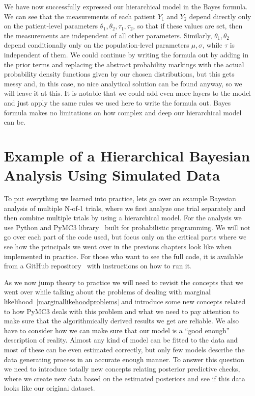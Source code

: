 \documentclass[12pt,a4paper,leqno]{report}
\theoremstyle{plain}
\theoremstyle{definition}
\theoremstyle{remark}
\begin{document}
We have now successfully expressed our hierarchical model in the Bayes formula.
We can see that the measurements of each patient \(Y_1 \) and \(Y_2 \) depend directly
only on the patient-level parameters \(\theta_1, \theta_2, \tau_1, \tau_2\), so that if these values are set, then the
measurements are independent of all other parameters. Similarly, \(\theta_1, \theta_2 \) depend conditionally only
on the population-level parameters \(\mu, \sigma \), while \(\tau \) is independent of
them. We could continue by writing the
formula out by adding in the prior terms and replacing the abstract probability
markings with the actual probability density functions given by our chosen
distributions, but this gets messy and, in this case, no nice analytical solution can be
found anyway, so we will leave it at this. It is notable that we could add even
more layers to the model and just apply the same rules we used here to write the formula
out. Bayes formula makes no limitations on how complex and deep our hierarchical model
can be.

\chapter{Example of a Hierarchical Bayesian Analysis Using Simulated Data}

To put everything we learned into practice, lets go over an example Bayesian
analysis of multiple N-of-1 trials, where we first analyze one trial separately and then
combine multiple trials by using a hierarchical model. For the analysis we use Python and PyMC3 library\ \cite{pymc3} built
for probabilistic programming. We will not go over each part of the code used, but focus only
on the critical parts where we see how the principals we went over in the
previous chapters look like when implemented in practice. For those who want to see the
full code, it is available from a GitHub repository\ \cite{github} with instructions on how
to run it.

As we now jump theory to practice we will need to revisit the concepts that we went over
while talking about the problems of dealing with marginal likelihood\
\ref{marginallikehoodproblems} and introduce some new concepts related to how
PyMC3 deals with this problem and what we need to pay attention to
make sure that the algorithmically derived results we get are reliable. We also have to
consider how we can make sure that our model is a ``good enough'' description of reality.
Almost any kind of model can be fitted to the data and most of these can be even
estimated correctly, but only few models describe the data generating process in an
accurate enough manner. To answer this question we need to introduce totally new concepts
relating posterior predictive checks, where we create new data based on the estimated
posteriors and see if this data looks like our original dataset.
\end{document}
